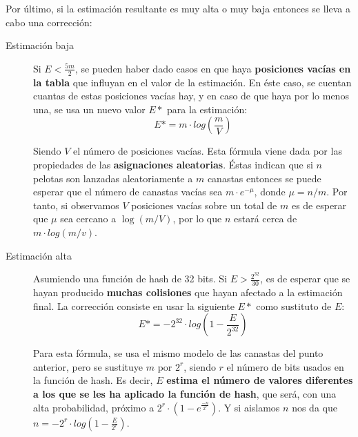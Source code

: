 Por último, si la estimación resultante es muy alta o muy baja entonces se lleva a cabo una corrección:

\begin{description}
\item[Estimación baja] Si $E < \frac{5m}{2}$, se pueden haber dado casos en que haya \textbf{posiciones vacías en la tabla} que
influyan en el valor de la estimación. En éste caso, se cuentan cuantas de estas posiciones vacías
hay, y en caso de que haya por lo menos una, se usa un nuevo valor $E*$ para la estimación: 
$$E* = m \cdot log\left(\frac{m}{V}\right)$$

Siendo $V$ el número de posiciones vacías. Esta fórmula viene dada por las propiedades de las
\textbf{asignaciones aleatorias}. Éstas indican que si $n$ pelotas son lanzadas aleatoriamente a $m$ canastas entonces
se puede esperar que el número de canastas vacías sea $m \cdot e^{-\mu}$, donde $\mu = n / m$. Por tanto, si observamos
$V$ posiciones vacías sobre un total de $m$ es de esperar que $\mu$ sea cercano a $\log(m/V)$, por lo que $n$ estará
cerca de $m \cdot log(m/v)$.

\item[Estimación alta] Asumiendo una función de hash de 32 bits. Si $E > \frac{2^{32}}{30}$, es de esperar que se hayan
producido \textbf{muchas colisiones} que hayan afectado a la estimación final. La corrección consiste en usar la siguiente $E*$
como sustituto de $E$:
$$E* = -2^{32} \cdot log\left(1 - \frac{E}{2^{32}}\right)$$

Para esta fórmula, se usa el mismo modelo de las canastas del punto anterior, pero se sustituye $m$
por $2^r$, siendo $r$ el número de bits usados en la función de hash. Es decir, $E$ \textbf{estima el número de valores diferentes
a los que se les ha aplicado la función de hash}, que será, con una alta probabilidad, próximo a $2^r \cdot (1 - e^{\frac{-n}{2^r}})$.
Y si aislamos $n$ nos da que $n=-2^r \cdot log\left(1 - \frac{E}{2^r}\right)$.

\end{description}
